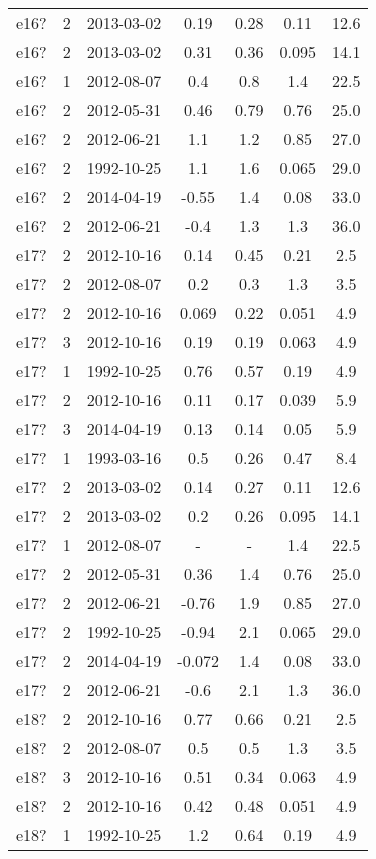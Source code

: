 \begin{table*}[htp]
\begin{tabular}{ccccccc}
e16? & 2 & 2013-03-02 & 0.19 & 0.28 & 0.11 & 12.6 \\
e16? & 2 & 2013-03-02 & 0.31 & 0.36 & 0.095 & 14.1 \\
e16? & 1 & 2012-08-07 & 0.4 & 0.8 & 1.4 & 22.5 \\
e16? & 2 & 2012-05-31 & 0.46 & 0.79 & 0.76 & 25.0 \\
e16? & 2 & 2012-06-21 & 1.1 & 1.2 & 0.85 & 27.0 \\
e16? & 2 & 1992-10-25 & 1.1 & 1.6 & 0.065 & 29.0 \\
e16? & 2 & 2014-04-19 & -0.55 & 1.4 & 0.08 & 33.0 \\
e16? & 2 & 2012-06-21 & -0.4 & 1.3 & 1.3 & 36.0 \\
e17? & 2 & 2012-10-16 & 0.14 & 0.45 & 0.21 & 2.5 \\
e17? & 2 & 2012-08-07 & 0.2 & 0.3 & 1.3 & 3.5 \\
e17? & 2 & 2012-10-16 & 0.069 & 0.22 & 0.051 & 4.9 \\
e17? & 3 & 2012-10-16 & 0.19 & 0.19 & 0.063 & 4.9 \\
e17? & 1 & 1992-10-25 & 0.76 & 0.57 & 0.19 & 4.9 \\
e17? & 2 & 2012-10-16 & 0.11 & 0.17 & 0.039 & 5.9 \\
e17? & 3 & 2014-04-19 & 0.13 & 0.14 & 0.05 & 5.9 \\
e17? & 1 & 1993-03-16 & 0.5 & 0.26 & 0.47 & 8.4 \\
e17? & 2 & 2013-03-02 & 0.14 & 0.27 & 0.11 & 12.6 \\
e17? & 2 & 2013-03-02 & 0.2 & 0.26 & 0.095 & 14.1 \\
e17? & 1 & 2012-08-07 & - & - & 1.4 & 22.5 \\
e17? & 2 & 2012-05-31 & 0.36 & 1.4 & 0.76 & 25.0 \\
e17? & 2 & 2012-06-21 & -0.76 & 1.9 & 0.85 & 27.0 \\
e17? & 2 & 1992-10-25 & -0.94 & 2.1 & 0.065 & 29.0 \\
e17? & 2 & 2014-04-19 & -0.072 & 1.4 & 0.08 & 33.0 \\
e17? & 2 & 2012-06-21 & -0.6 & 2.1 & 1.3 & 36.0 \\
e18? & 2 & 2012-10-16 & 0.77 & 0.66 & 0.21 & 2.5 \\
e18? & 2 & 2012-08-07 & 0.5 & 0.5 & 1.3 & 3.5 \\
e18? & 3 & 2012-10-16 & 0.51 & 0.34 & 0.063 & 4.9 \\
e18? & 2 & 2012-10-16 & 0.42 & 0.48 & 0.051 & 4.9 \\
e18? & 1 & 1992-10-25 & 1.2 & 0.64 & 0.19 & 4.9 \\

\end{tabular}
\end{table*}
